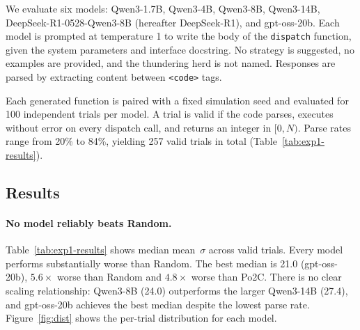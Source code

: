 \documentclass[11pt]{article}
\begin{document}
We evaluate six models: Qwen3-1.7B, Qwen3-4B, Qwen3-8B, Qwen3-14B,
DeepSeek-R1-0528-Qwen3-8B (hereafter DeepSeek-R1), and gpt-oss-20b.
Each model is prompted at temperature 1 to write the body of the
\texttt{dispatch} function, given the system parameters and interface
docstring.
No strategy is suggested, no examples are provided, and the thundering
herd is not named.
Responses are parsed by extracting content between \texttt{<code>}
tags.

Each generated function is paired with a fixed simulation seed and
evaluated for 100 independent trials per model.
A trial is valid if the code parses, executes without error on every
dispatch call, and returns an integer in $[0, N)$.
Parse rates range from 20\% to 84\%, yielding 257 valid trials in total
(Table~\ref{tab:exp1-results}).

\subsection{Results}
\label{sec:exp1-results}

\paragraph{No model reliably beats Random.}
Table~\ref{tab:exp1-results} shows median mean~$\sigma$ across valid
trials.
Every model performs substantially worse than Random.
The best median is 21.0 (gpt-oss-20b), $5.6\times$ worse than Random
and $4.8\times$ worse than Po2C.
There is no clear scaling relationship: Qwen3-8B (24.0) outperforms
the larger Qwen3-14B (27.4), and gpt-oss-20b achieves the best median
despite the lowest parse rate.
Figure~\ref{fig:dist} shows the per-trial distribution for each model.
\end{document}
